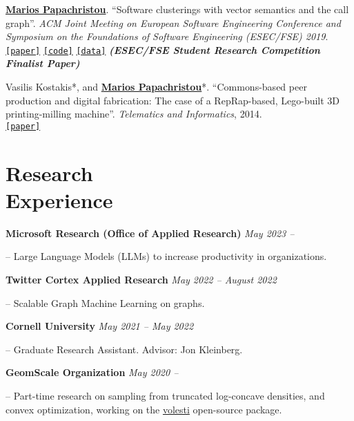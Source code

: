 \documentclass[margin]{res}
\newcommand{\specialurl}[2]{\href {#2} {\texttt{[#1]}}}
\newcommand{\code}[1]{\specialurl {code} {#1}}
\newcommand{\data}[1]{\specialurl {data} {#1}}
\newcommand{\paper}[1]{\specialurl {paper} {#1}}
\newcommand{\authorref}[1]{\underline {\textbf{#1}}}
\newcommand{\authorme}{\authorref{Marios Papachristou}}
\begin{document}
\begin{resume}
\begin{compactenum}
    \item \authorme. ``Software clusterings with vector semantics and the call graph''. \emph{ACM Joint Meeting on European Software Engineering Conference and Symposium on the Foundations of Software Engineering (ESEC/FSE) 2019}. \\ \paper{https://dl.acm.org/citation.cfm?id=3342483} \code{https://github.com/papachristoumarios/sade} \data{http://doi.org/10.5281/zenodo.2652487} \textbf{\emph{(ESEC/FSE Student Research Competition Finalist Paper)}}
    \item Vasilis Kostakis*, and \authorme*. ``Commons-based peer production and digital fabrication: The case of a RepRap-based, Lego-built 3D printing-milling machine''. \emph{Telematics and Informatics}, 2014. \\ \paper{https://bit.ly/2JRoisV} 
    
\end{compactenum}



\section{Research \\ Experience}

 \textbf{Microsoft Research (Office of Applied Research)} \hfill \emph{May 2023 --}

\begin{compactitem}
	\item[--] Large Language Models (LLMs) to increase productivity in organizations. 	
\end{compactitem}


\textbf{Twitter Cortex Applied Research} \hfill \emph{May 2022 -- August 2022}
\begin{compactitem}
\item[--] Scalable Graph Machine Learning on graphs. 
\end{compactitem}

\textbf{Cornell University} \hfill \emph{May 2021 -- May 2022}
\begin{compactitem}
	\item[--] Graduate Research Assistant. Advisor: Jon Kleinberg.	
\end{compactitem}


\textbf{GeomScale Organization} \hfill \emph{May 2020 --}

\begin{compactitem}
	\item[--] Part-time research on sampling from truncated log-concave densities, and convex optimization, working on the \href{https://github.com/GeomScale/volesti}{volesti} open-source package.
\end{compactitem}




\end{resume}
\end{document}
